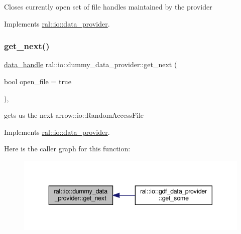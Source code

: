Closes currently open set of file handles maintained by the provider 

Implements \hyperlink{classral_1_1io_1_1data__provider_afa6216bccde854b011ed098e114ba8b3}{ral\+::io\+::data\+\_\+provider}.

\mbox{\label{classral_1_1io_1_1dummy__data__provider_a0e0f9cf9d1c6b4878236746e6c83c108}} 
\subsubsection{\texorpdfstring{get\+\_\+next()}{get\_next()}}
{\footnotesize\ttfamily \hyperlink{structral_1_1io_1_1data__handle}{data\+\_\+handle} ral\+::io\+::dummy\+\_\+data\+\_\+provider\+::get\+\_\+next (\begin{DoxyParamCaption}\item[{bool}]{open\+\_\+file = {\ttfamily true} }\end{DoxyParamCaption})\hspace{0.3cm}{\ttfamily [inline]}, {\ttfamily [virtual]}}

gets us the next arrow\+::io\+::\+Random\+Access\+File 

Implements \hyperlink{classral_1_1io_1_1data__provider_aa49cde8c92f3bc4e9fcbe2e8f34e7ba3}{ral\+::io\+::data\+\_\+provider}.

Here is the caller graph for this function\+:\nopagebreak
\begin{figure}[H]
\begin{center}
\leavevmode
\includegraphics[width=343pt]{classral_1_1io_1_1dummy__data__provider_a0e0f9cf9d1c6b4878236746e6c83c108_icgraph}
\end{center}
\end{figure}
\mbox{\label{classral_1_1io_1_1dummy__data__provider_a05a005b12166902815522d924af87aed}} 
